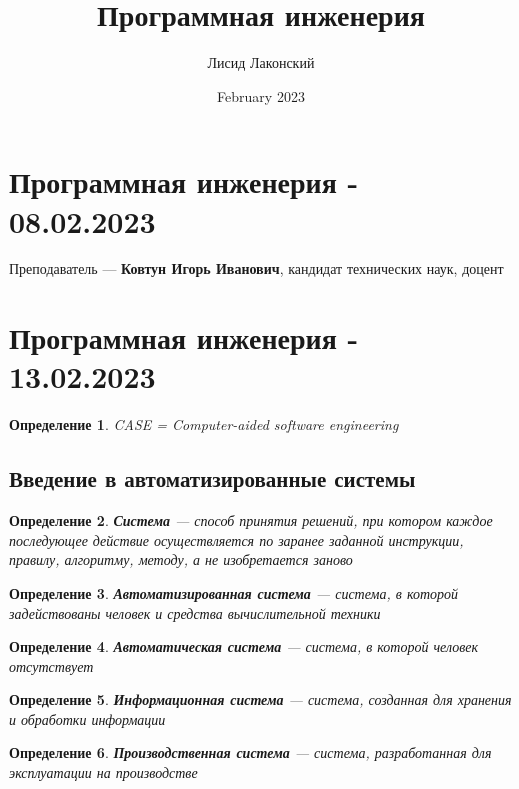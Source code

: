 \documentclass{article}
\title{Программная инженерия}
\author{Лисид Лаконский}
\date{February 2023}
\newtheorem{definition}{Определение}
\begin{document}
\raggedright

\maketitle
\tableofcontents
\pagebreak

\section{Программная инженерия - 08.02.2023}

Преподаватель — \textbf{Ковтун Игорь Иванович}, кандидат технических наук, доцент

\pagebreak
\section{Программная инженерия - 13.02.2023}

\begin{definition}
    CASE = Computer-aided software engineering
\end{definition}

\subsection{Введение в автоматизированные системы}

\begin{definition}
    \textbf{Система} — способ принятия решений, при котором каждое последующее действие осуществляется по заранее заданной инструкции, правилу, алгоритму, методу, а не изобретается заново
\end{definition}

\begin{definition}
    \textbf{Автоматизированная система} — система, в которой задействованы человек и средства вычислительной техники
\end{definition}

\begin{definition}
    \textbf{Автоматическая система} — система, в которой человек отсутствует
\end{definition}

\begin{definition}
    \textbf{Информационная система} — система, созданная для хранения и обработки информации
\end{definition}

\begin{definition}
    \textbf{Производственная система} — система, разработанная для эксплуатации на производстве
\end{definition}
\end{document}
